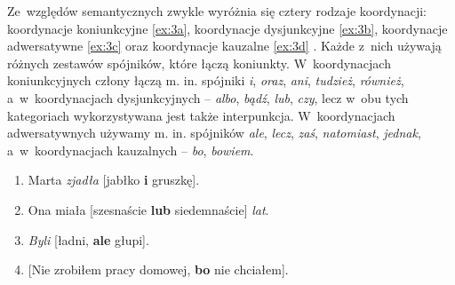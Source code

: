 \documentclass[licencjacka]{pracamgr_Kogni}
\begin{document}
Ze~względów semantycznych zwykle wyróżnia się cztery rodzaje koordynacji: koordynacje koniunkcyjne \ref{ex:3a}, koordynacje dysjunkcyjne \ref{ex:3b}, koordynacje adwersatywne \ref{ex:3c} oraz koordynacje kauzalne \ref{ex:3d} \citep{Haspelmath2007}. Każde z~nich używają różnych zestawów spójników, które łączą koniunkty. W~koordynacjach koniunkcyjnych człony łączą m. in. spójniki \textit{i}, \textit{oraz}, \textit{ani}, \textit{tudzież}, \textit{również}, a~w~koordynacjach dysjunkcyjnych -- \textit{albo}, \textit{bądź}, \textit{lub}, \textit{czy}, lecz w~obu tych kategoriach wykorzystywana jest także interpunkcja. W~koordynacjach adwersatywnych używamy m. in. spójników \textit{ale}, \textit{lecz}, \textit{zaś}, \textit{natomiast}, \textit{jednak}, a~w~koordynacjach kauzalnych -- \textit{bo}, \textit{bowiem}. %
\begin{exe}
    \ex
    \begin{enumerate}
        \item {Marta \textit{zjadła} [jabłko \textbf{i} gruszkę].}
            \label {ex:3a}
        \item {Ona miała [szesnaście \textbf{lub} siedemnaście] \textit{lat}.}
            \label {ex:3b}
        \item {\textit{Byli} [ładni, \textbf{ale} głupi].}
            \label {ex:3c}
        \item {[Nie zrobiłem pracy domowej, \textbf{bo} nie chciałem].}
            \label {ex:3d}
    \end{enumerate}
    \label{ex:3}
\end{exe}
\end{document}
